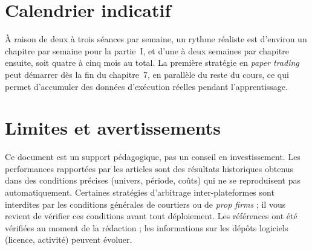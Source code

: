 \documentclass[11pt,a4paper]{article}
\begin{document}
\section{Calendrier indicatif}

À raison de deux à trois séances par semaine, un rythme réaliste est d'environ un chapitre par semaine pour la partie~I, et d'une à deux semaines par chapitre ensuite, soit quatre à cinq mois au total. La première stratégie en \emph{paper trading} peut démarrer dès la fin du chapitre~7, en parallèle du reste du cours, ce qui permet d'accumuler des données d'exécution réelles pendant l'apprentissage.

\section{Limites et avertissements}

Ce document est un support pédagogique, pas un conseil en investissement. Les performances rapportées par les articles sont des résultats historiques obtenus dans des conditions précises (univers, période, coûts) qui ne se reproduisent pas automatiquement. Certaines stratégies d'arbitrage inter-plateformes sont interdites par les conditions générales de courtiers ou de \emph{prop firms} ; il vous revient de vérifier ces conditions avant tout déploiement. Les références ont été vérifiées au moment de la rédaction ; les informations sur les dépôts logiciels (licence, activité) peuvent évoluer.



\end{document}
